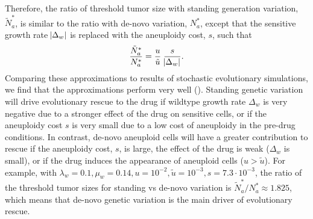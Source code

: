 \documentclass[12pt]{extarticle}
\begin{document}
Therefore, the ratio of threshold tumor size with standing generation variation, $\tilde{N}^*_{a}$, is similar to the ratio with de-novo variation, $N^*_a$, except that the sensitive growth rate $\abs{\Delta_w}$ is replaced with the aneuploidy cost, $s$, such that 
\begin{equation}\label{eq:Nsgv}
\frac{\tilde{N}^*_{a}}{N^*_{a}} = \frac{u}{\tilde{u}} \; \frac{s}{\abs{\Delta_w}}.
\end{equation}
Comparing these approximations to results of stochastic evolutionary simulations, we find that the approximations perform very well ().  %
Standing genetic variation will drive evolutionary rescue to the drug if wildtype growth rate $\Delta_w$ is very negative due to a stronger effect of the drug on sensitive cells, or if the aneuploidy cost $s$ is very small due to a low cost of aneuploidy in the pre-drug conditions.
In contrast, de-novo aneuploid cells will have a greater contribution to rescue if the aneuploidy cost, $s$, is large, the effect of the drug is weak ($\Delta_w$ is small), or if the drug induces the appearance of aneuploid cells ($u > \tilde u$).
For example, with  $\lambda_w=0.1,\mu_w=0.14, u=10^{-2}, \tilde{u}=10^{-3}, s=7.3\cdot10^{-3}$, the ratio of the threshold tumor sizes for standing vs de-novo variation is $\tilde{N}^*_a/N^*_a \approx 1.825$, which means that de-novo genetic variation is  the main driver of evolutionary rescue.
\end{document}
